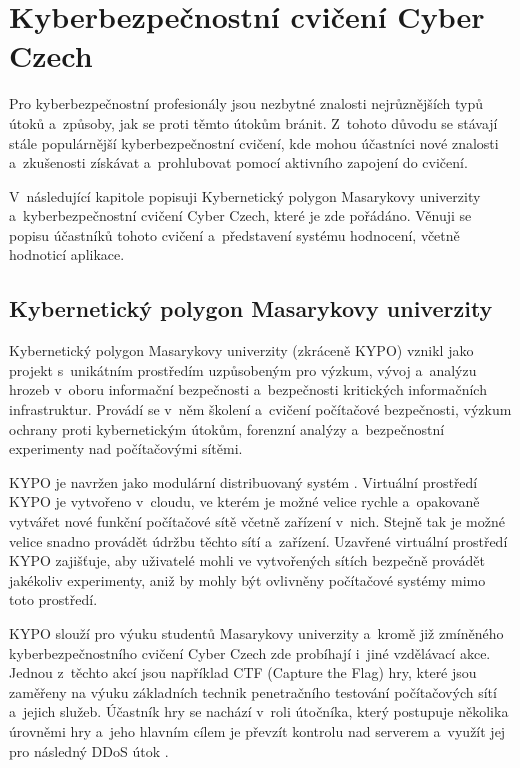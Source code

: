 \documentclass[
  digital,
  twoside,
  table, 
  nolof, 
  nolot
]{fithesis3}
\begin{document}
\chapter{Kyberbezpečnostní cvičení Cyber Czech}
\label{cyberex}

Pro kyberbezpečnostní profesionály jsou nezbytné znalosti nejrůznějších typů útoků a~způsoby, jak se proti těmto útokům bránit. Z~tohoto důvodu se stávají stále populárnější kyberbezpečnostní cvičení, kde mohou účastníci nové znalosti a~zkušenosti získávat a~prohlubovat pomocí aktivního zapojení do cvičení.

V~následující kapitole popisuji Kybernetický polygon Masarykovy univerzity a~kyberbezpečnostní cvičení Cyber Czech, které je zde pořádáno. Věnuji se popisu účastníků tohoto cvičení a~představení systému hodnocení, včetně hodnoticí aplikace.

\section{Kybernetický polygon Masarykovy univerzity}

Kybernetický polygon Masarykovy univerzity (zkráceně KYPO) vznikl jako projekt s~unikátním prostředím uzpůsobeným pro výzkum, vývoj a~analýzu hrozeb v~oboru informační bezpečnosti a~bezpečnosti kritických informačních infrastruktur. Provádí se v~něm školení a~cvičení počítačové bezpečnosti, výzkum ochrany proti kybernetickým útokům, forenzní analýzy a~bezpečnostní experimenty nad počítačovými sítěmi.

KYPO je navržen jako modulární distribuovaný systém \cite{Vykopal2017KYPOCases}. Virtuální prostředí KYPO je vytvořeno v~cloudu, ve kterém je možné velice rychle a~opakovaně vytvářet nové funkční počítačové sítě včetně zařízení v~nich. Stejně tak je možné velice snadno provádět údržbu těchto sítí a~zařízení. Uzavřené virtuální prostředí KYPO zajišťuje, aby uživatelé mohli ve vytvořených sítích bezpečně provádět jakékoliv experimenty, aniž by mohly být ovlivněny počítačové systémy mimo toto prostředí.

KYPO slouží pro výuku studentů Masarykovy univerzity a~kromě již zmíněného kyberbezpečnostního cvičení Cyber Czech zde probíhají i~jiné vzdělávací akce. Jednou z~těchto akcí jsou například CTF (Capture the Flag) hry, které jsou zaměřeny na výuku základních technik penetračního testování počítačových sítí a~jejich služeb. Účastník hry se nachází v~roli útočníka, který postupuje několika úrovněmi hry a~jeho hlavním cílem je převzít kontrolu nad serverem a~využít jej pro následný DDoS útok \cite{Vykopal2017KYPOCases}.
\end{document}
